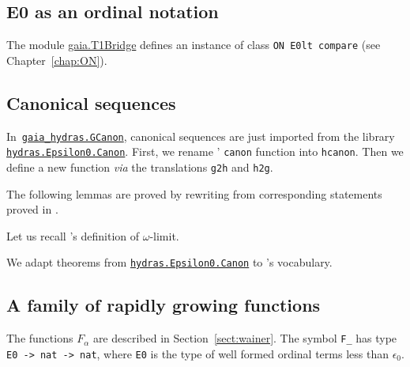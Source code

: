 
\subsection{E0 as an ordinal notation}
The module \href{../theories/html/gaia.T1Bridge.html}{gaia.T1Bridge} defines an instance of class \texttt{ON E0lt compare}
(see Chapter~\ref{chap:ON}).


\subsection{Canonical sequences}


In~\href{../theories/html/gaia_hydras.GCanon.html}%
{\texttt{gaia\_hydras.GCanon}}, canonical sequences are just imported from the library \linebreak
\href{../theories/html/hydras.Epsilon0.Canon.html}%
{\texttt{hydras.Epsilon0.Canon}}.
First, we rename \HydrasLib' \texttt{canon} function into
\texttt{hcanon}. Then we define a new function \emph{via} the
translations \texttt{g2h} and \texttt{h2g}.


The following lemmas are proved by rewriting from corresponding statements proved in \HydrasLib.



Let us recall \gaia's definition of $\omega$-limit.


We adapt theorems from \href{../theories/html/hydras.Epsilon0.Canon.html}%
{\texttt{hydras.Epsilon0.Canon}} to \gaia's vocabulary.


\subsection{A family of rapidly growing functions}

The functions $F_\alpha$ are described in Section~\vref{sect:wainer}. The symbol \texttt{F\_} has type \texttt{E0 -> nat -> nat},
where \texttt{E0} is the type of well formed ordinal terms less than $\epsilon_0$.

